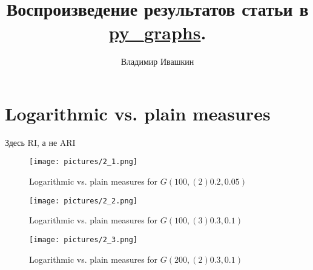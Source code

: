 \documentclass{article}
\title{
        Воспроизведение результатов статьи в \href{https://github.com/illusionww/py_graphs}{py\_graphs}.
}
\author{Владимир Ивашкин}
\begin{document}
\maketitle

\setcounter{section}{1}

\section{Logarithmic vs. plain measures}

Здесь RI, а не ARI

\begin{figure}[H]
	\texttt{[image: pictures/2\_1.png]}
	\caption{\label{f_vs1}Logarithmic vs. plain measures for $G(100, (2)0.2, 0.05)$}
\end{figure}

\begin{figure}[H]
	\texttt{[image: pictures/2\_2.png]}
	\caption{\label{f_vs2}Logarithmic vs. plain measures for $G(100, (3)0.3, 0.1)$}
\end{figure}

\begin{figure}[H]
	\texttt{[image: pictures/2\_3.png]}
	\caption{\label{f_vs3}Logarithmic vs. plain measures for $G(200, (2)0.3, 0.1)$}
\end{figure}
\nopagebreak


\newpage
\end{document}
